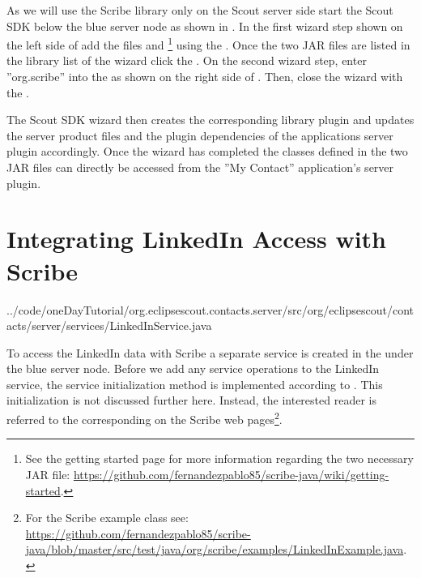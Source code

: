 \documentclass[a4paper,10pt,twoside]{book}
\begin{document}
As we will use the Scribe library only on the Scout server side start the Scout SDK  below the blue server node as shown in . 
In the first wizard step shown on the left side of  add the files  and \footnote{
See the getting started page for more information regarding the two necessary JAR file: \url{https://github.com/fernandezpablo85/scribe-java/wiki/getting-started}.
} 
using the . 
Once the two JAR files are listed in the library list of the wizard click the .
On the second wizard step, enter ''org.scribe'' into the  as shown on the right side of . 
Then, close the wizard with the .

The Scout SDK wizard then creates the corresponding library plugin and updates the server product files and the plugin dependencies of the applications server plugin accordingly. 
Once the wizard has completed the classes defined in the two JAR files can directly be accessed from the ''My Contact'' application's server plugin.

\section{Integrating LinkedIn Access with Scribe}


{../code/oneDayTutorial/org.eclipsescout.contacts.server/src/org/eclipsescout/contacts/server/services/LinkedInService.java}

To access the LinkedIn data with Scribe a separate service  is created in the  under the blue server node. 
Before we add any service operations to the LinkedIn service, the service initialization method is implemented according to . 
This initialization is not discussed further here.
Instead, the interested reader is referred to the corresponding  on the Scribe web pages\footnote{
For the Scribe  example class see: \url{https://github.com/fernandezpablo85/scribe-java/blob/master/src/test/java/org/scribe/examples/LinkedInExample.java}.
}.
\end{document}
